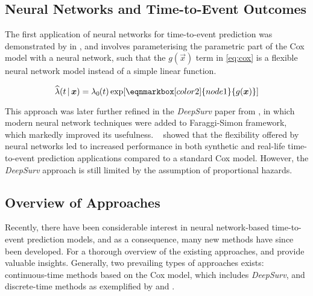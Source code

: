 \subsection{Neural Networks and Time-to-Event Outcomes}

The first application of neural networks for time-to-event prediction
was demonstrated by
\citeauthor{faraggiNeural1995} in
\citeyear{faraggiNeural1995},
and involves parameterising the parametric part of the Cox model
with a neural network, 
such that the \(g(\vec{x})\) term in \cref{eq:cox} is a 
flexible neural network model instead of a simple linear function.
\autocite{faraggiNeural1995}

\vspace{.5em}
\begin{equation*}
    \widehat{\lambda} (t \,|\, \vec{x}) = \hzt \exp [
    \eqnmarkbox[color2]{node1}{
        g(\vec{x})
    }]
\end{equation*}

This approach was later further refined
in the \emph{DeepSurv} paper from 
\citeyear{katzmanDeepSurv2018a},
in which modern neural network techniques
were added to Faraggi-Simon framework, 
which markedly improved its usefulness.
~\autocite{katzmanDeepSurv2018a}
\citeauthor{katzmanDeepSurv2018a} showed that the flexibility 
offered by neural networks led to increased performance
in both synthetic and real-life time-to-event prediction applications
compared to a standard Cox model.
However, the \emph{DeepSurv} approach is still limited by the 
assumption of proportional hazards.

\subsection{Overview of Approaches}

Recently, there have been considerable interest in neural network-based
time-to-event prediction models, and as a consequence, many new methods 
have since been developed.
For a thorough overview of the existing approaches, 
\textcite{wiegrebeDeep2023} and 
\textcite{kvammeContinuous2021} provide valuable insights.
Generally, two prevailing types of approaches exists:
continuous-time methods based on the Cox model, 
which includes \emph{DeepSurv},
and discrete-time methods as exemplified by 
\textcite{leeDeepHit2018} and \textcite{gensheimerScalable2019}.

